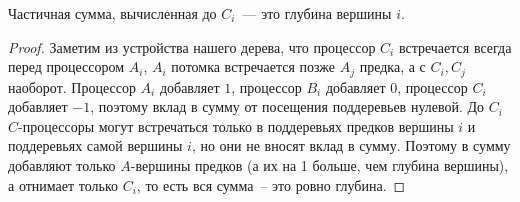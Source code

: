\begin{theorem*}
	Частичная сумма, вычисленная до $C_i$~--- это глубина вершины $i$.
\end{theorem*}
\begin{proof}
	Заметим из устройства нашего дерева, что процессор $C_i$ встречается всегда перед процессором $A_i$, $A_i$ потомка встречается позже $A_j$ предка, а с $C_i,C_j$ наоборот. Процессор $A_i$ добавляет $1$, процессор $B_i$ добавляет $0$, процессор $C_i$ добавляет $-1$, поэтому вклад в сумму от посещения поддеревьев нулевой. До $C_i$ $C$-процессоры могут встречаться только в поддеревьях предков вершины $i$ и поддеревьях самой вершины $i$, но они не вносят вклад в сумму. Поэтому в сумму добавляют только $A$-вершины предков (а их на 1 больше, чем глубина вершины), а отнимает только $C_i$, то есть вся сумма~-- это ровно глубина.
\end{proof}